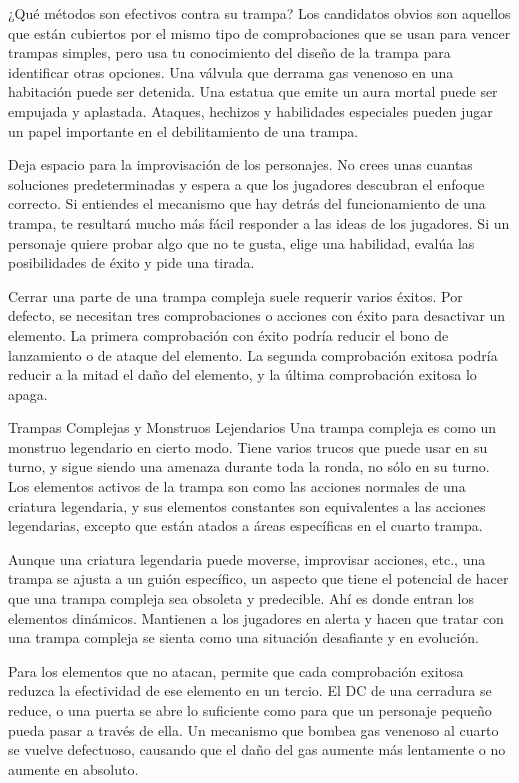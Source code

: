 \documentclass[a4paper,twocolumn,openany,10pt]{dndbook}
\begin{document}
¿Qué métodos son efectivos contra su trampa? Los candidatos obvios son aquellos que están cubiertos por el mismo tipo de
comprobaciones que se usan para vencer trampas simples, pero usa tu conocimiento del diseño de la trampa para identificar otras
opciones. Una válvula que derrama gas venenoso en una habitación puede ser detenida. Una estatua que emite un aura mortal puede
ser empujada y aplastada. Ataques, hechizos y habilidades especiales pueden jugar un papel importante en el debilitamiento de
una trampa.

Deja espacio para la improvisación de los personajes. No crees unas cuantas soluciones predeterminadas y espera a que los
jugadores descubran el enfoque correcto. Si entiendes el mecanismo que hay detrás del funcionamiento de una trampa, te resultará
mucho más fácil responder a las ideas de los jugadores. Si un personaje quiere probar algo que no te gusta, elige una habilidad,
evalúa las posibilidades de éxito y pide una tirada.

Cerrar una parte de una trampa compleja suele requerir varios éxitos. Por defecto, se necesitan tres comprobaciones o acciones
con éxito para desactivar un elemento. La primera comprobación con éxito podría reducir el bono de lanzamiento o de ataque del
elemento. La segunda comprobación exitosa podría reducir a la mitad el daño del elemento, y la última comprobación exitosa lo
apaga.

\begin{paperbox}[float=!b]{Trampas Complejas y Monstruos Lejendarios}
	Una trampa compleja es como un monstruo legendario en cierto modo. Tiene varios trucos que puede usar en su turno, y sigue
	siendo una amenaza durante toda la ronda, no sólo en su turno. Los elementos activos de la trampa son como las acciones
	normales de una criatura legendaria, y sus elementos constantes son equivalentes a las acciones legendarias, excepto que
	están atados a áreas específicas en el cuarto trampa.
	
	Aunque una criatura legendaria puede moverse, improvisar acciones, etc., una trampa se ajusta a un guión específico, un
	aspecto que tiene el potencial de hacer que una trampa compleja sea obsoleta y predecible. Ahí es donde entran los elementos
	dinámicos. Mantienen a los jugadores en alerta y hacen que tratar con una trampa compleja se sienta como una situación
	desafiante y en evolución. 
\end{paperbox}

Para los elementos que no atacan, permite que cada comprobación exitosa reduzca la efectividad de ese elemento en un tercio. El
DC de una cerradura se reduce, o una puerta se abre lo suficiente como para que un personaje pequeño pueda pasar a través de
ella. Un mecanismo que bombea gas venenoso al cuarto se vuelve defectuoso, causando que el daño del gas aumente más lentamente o
no aumente en absoluto.
\end{document}
